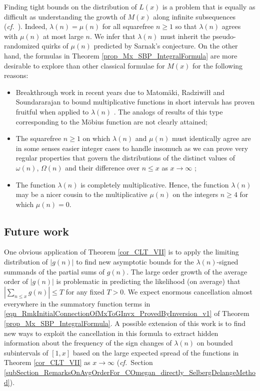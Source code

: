 \documentclass[11pt,reqno,a4letter]{article}
\newcommand{\hlocalref}[1]{\hyperref[#1]{\ref{#1}}}
\numberwithin{equation}{section}
\numberwithin{figure}{section}
\numberwithin{table}{section}
\let\citep\cite
\newcommand{\cf}{\textit{cf.\ }}
\theoremstyle{plain}
\numberwithin{theorem}{section}
\theoremstyle{definition}
\begin{document}
Finding tight bounds on the distribution of 
$L(x)$ is a problem that is equally as difficult 
as understanding the growth of $M(x)$
along infinite subsequences (\cf \cite{MR2877066,MR3779960,TAO-LOGAVGD-CHOWLA}). 
Indeed, $\lambda(n) = \mu(n)$ for all squarefree $n \geq 1$ so that 
$\lambda(n)$ agrees with $\mu(n)$ at most large $n$. 
We infer that $\lambda(n)$ must inherit the pseudo-randomized quirks 
of $\mu(n)$ predicted by Sarnak's conjecture. 
On the other hand, the formulas in 
Theorem \hlocalref{prop_Mx_SBP_IntegralFormula} are more desirable to explore than 
other classical formulae for $M(x)$ for the following reasons:
\begin{itemize}[noitemsep,topsep=0pt,leftmargin=0.23in]
\item Breakthrough work in recent years due to 
	Matom\"aki, Radziwi{\l\l} and Soundararajan to 
	bound multiplicative functions 
	in short intervals has 
	proven fruitful when applied to $\lambda(n)$ 
	\cite{SOUND-LLAMBDA-SHORT-INTS,MATRADZE-MULTFUNCS-SHORT-INTS}. 
	The analogs of results of this type corresponding 
	to the M\"obius function are not clearly attained; 
\item The squarefree $n \geq 1$ on which $\lambda(n)$ and $\mu(n)$ must identically agree 
	are in some senses easier integer cases to handle 
	insomuch as we can prove very regular properties 
	that govern the distributions of the distinct values of 
	$\omega(n)$, $\Omega(n)$ and their difference over $n \leq x$ as $x \rightarrow \infty$ 
	\citep[\cf \S 2.4; \S 7.4]{MV}; 
\item The function $\lambda(n)$ is completely 
	multiplicative. Hence, the function $\lambda(n)$ may be 
	a nicer cousin to the multiplicative $\mu(n)$ on the 
	integers $n \geq 4$ for which $\mu(n) = 0$. 
\end{itemize}

\subsection{Future work} 
\label{remark_ConjPropApps_SumsOfGx_v1} 

One obvious application of 
Theorem \hlocalref{cor_CLT_VII} 
is to apply the limiting distribution of $|g(n)|$ to find 
new asymptotic bounds for the $\lambda(n)$-signed summands of the 
partial sums of $g(n)$. 
The large order growth of the average order of $|g(n)|$ is problematic in 
predicting the likelihood (on average) that 
$\left\lvert \sum_{n \leq x} g(n) \right\rvert \leq T$ for any fixed $T > 0$. 
We expect enormous cancellation almost everywhere 
in the summatory function terms in 
\eqref{eqn_RmkInitialConnectionOfMxToGInvx_ProvedByInversion_v1} of 
Theorem \hlocalref{prop_Mx_SBP_IntegralFormula}. 
A possible extension of this work is to find new ways to 
exploit the cancellation in this formula to extract 
hidden information about the frequency of the sign changes of $\lambda(n)$ 
on bounded subintervals of $[1, x]$ based on the large expected spread of the functions in 
Theorem \hlocalref{cor_CLT_VII} as $x \rightarrow \infty$ 
(\cf Section \hlocalref{subSection_RemarksOnAvgOrderFor_COmegan_directly_SelbergDelangeMethod}). 
\end{document}
